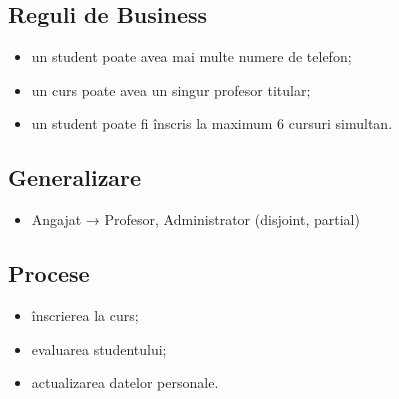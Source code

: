 \documentclass[12pt,a4paper]{article}
\begin{document}
\subsection*{Reguli de Business}
\begin{itemize}[noitemsep]
    \item un student poate avea mai multe numere de telefon;
    \item un curs poate avea un singur profesor titular;
    \item un student poate fi înscris la maximum 6 cursuri simultan.
\end{itemize}

\subsection*{Generalizare}
\begin{itemize}[noitemsep]
    \item Angajat → Profesor, Administrator (disjoint, partial)
\end{itemize}

\subsection*{Procese}
\begin{itemize}[noitemsep]
    \item înscrierea la curs;
    \item evaluarea studentului;
    \item actualizarea datelor personale.
\end{itemize}
\end{document}
